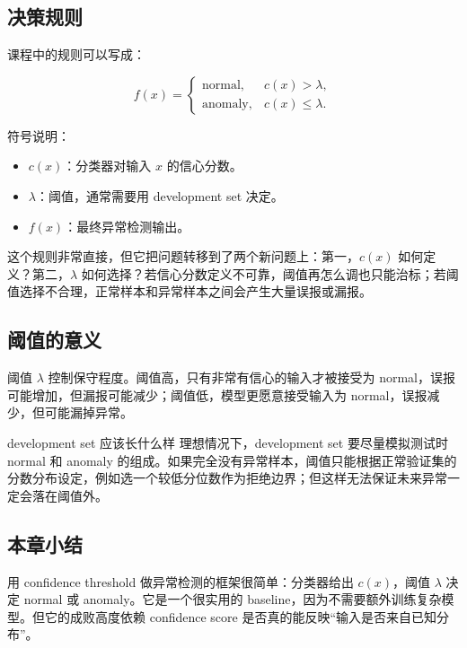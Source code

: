 \documentclass[a4paper]{article}
\begin{document}
\subsection{决策规则}

课程中的规则可以写成：

\[
f(x)=
\begin{cases}
\mathrm{normal}, & c(x)>\lambda,\\
\mathrm{anomaly}, & c(x)\le \lambda.
\end{cases}
\]

符号说明：
\begin{itemize}
    \item $c(x)$：分类器对输入 $x$ 的信心分数。
    \item $\lambda$：阈值，通常需要用 development set 决定。
    \item $f(x)$：最终异常检测输出。
\end{itemize}

这个规则非常直接，但它把问题转移到了两个新问题上：第一，$c(x)$ 如何定义？第二，$\lambda$ 如何选择？若信心分数定义不可靠，阈值再怎么调也只能治标；若阈值选择不合理，正常样本和异常样本之间会产生大量误报或漏报。

\subsection{阈值的意义}

阈值 $\lambda$ 控制保守程度。阈值高，只有非常有信心的输入才被接受为 normal，误报可能增加，但漏报可能减少；阈值低，模型更愿意接受输入为 normal，误报减少，但可能漏掉异常。

\begin{knowledgebox}{development set 应该长什么样}
    理想情况下，development set 要尽量模拟测试时 normal 和 anomaly 的组成。如果完全没有异常样本，阈值只能根据正常验证集的分数分布设定，例如选一个较低分位数作为拒绝边界；但这样无法保证未来异常一定会落在阈值外。
\end{knowledgebox}

\subsection{本章小结}

用 confidence threshold 做异常检测的框架很简单：分类器给出 $c(x)$，阈值 $\lambda$ 决定 normal 或 anomaly。它是一个很实用的 baseline，因为不需要额外训练复杂模型。但它的成败高度依赖 confidence score 是否真的能反映“输入是否来自已知分布”。

\end{document}
